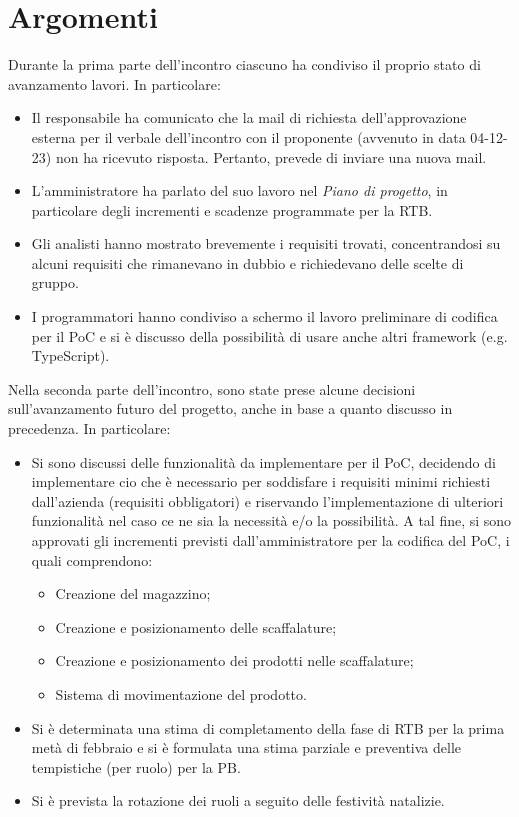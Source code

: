 \section{Argomenti}
Durante la prima parte dell'incontro ciascuno ha condiviso il proprio stato di avanzamento lavori. In particolare:
\begin{itemize}
    \item Il responsabile ha comunicato che la mail di richiesta dell'approvazione esterna per il verbale dell'incontro con il proponente (avvenuto in data 04-12-23) non ha ricevuto risposta. Pertanto, prevede di inviare una nuova mail.
    \item L'amministratore ha parlato del suo lavoro nel \textit{Piano di progetto}, in particolare degli incrementi e scadenze programmate per la RTB.
    \item Gli analisti hanno mostrato brevemente i requisiti trovati, concentrandosi su alcuni requisiti che rimanevano in dubbio e richiedevano delle scelte di gruppo.
    \item I programmatori hanno condiviso a schermo il lavoro preliminare di codifica per il PoC e si è discusso della possibilità di usare anche altri framework (e.g. TypeScript).
\end{itemize}

\noindent Nella seconda parte dell'incontro, sono state prese alcune decisioni sull'avanzamento futuro del progetto, anche in base a quanto discusso in precedenza. In particolare:
\begin{itemize}
    \item Si sono discussi delle funzionalità da implementare per il PoC, decidendo di implementare cio che è necessario per soddisfare i requisiti minimi richiesti dall'azienda (requisiti obbligatori) e riservando l'implementazione di ulteriori funzionalità nel caso ce ne sia la necessità e/o la possibilità. A tal fine, si sono approvati gli incrementi previsti dall'amministratore per la codifica del PoC, i quali comprendono: 
    \begin{itemize}
        \item Creazione del magazzino;
        \item Creazione e posizionamento delle scaffalature;
        \item Creazione e posizionamento dei prodotti nelle scaffalature;
        \item Sistema di movimentazione del prodotto.
    \end{itemize}
    \item Si è determinata una stima di completamento della fase di RTB per la prima metà di febbraio e si è formulata una stima parziale e preventiva delle tempistiche (per ruolo) per la PB.
    \item Si è prevista la rotazione dei ruoli a seguito delle festività natalizie.
\end{itemize}



